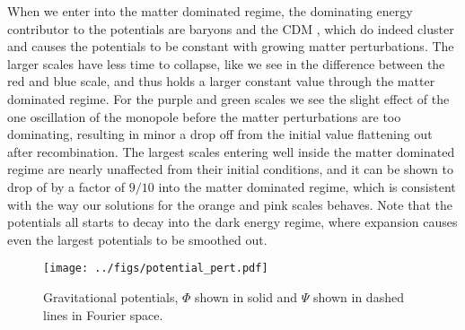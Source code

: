 \documentclass[10pt,a4paper]{article}
\providecommand{\rCDM}
{\ensuremath{
\textrm{CDM}
}
}
\begin{document}
When we enter into the matter dominated regime, the dominating energy contributor to the potentials are baryons and the \rCDM, which do indeed cluster and causes the potentials to be constant with growing matter perturbations. The larger scales have less time to collapse, like we see in the difference between the red and blue scale, and thus holds a larger constant value through the matter dominated regime. For the purple and green scales we see the slight effect of the one oscillation of the monopole before the matter perturbations are too dominating, resulting in minor a drop off from the initial value flattening out after recombination. The largest scales entering well inside the matter dominated regime are nearly unaffected from their initial conditions, and it can be shown to drop of by a factor of $9/10$ into the matter dominated regime, which is consistent with the way our solutions for the orange and pink scales behaves. Note that the potentials all starts to decay into the dark energy regime, where expansion causes even the largest potentials to be smoothed out.

\begin{figure}[ht!]
\centering
\texttt{[image: ../figs/potential\_pert.pdf]}
\caption{Gravitational potentials, $\Phi$ shown in solid and $\Psi$ shown in dashed lines in Fourier space.}
\label{fig:Gravitational potentials}
\end{figure}




\end{document}
